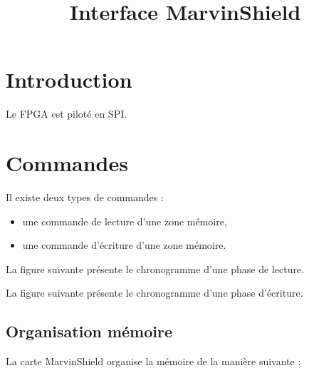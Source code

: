 \documentclass[11pt]{article}
\begin{document}
\title{Interface MarvinShield}

\section{Introduction}

Le FPGA est piloté en SPI.


\section{Commandes}

Il existe deux types de commandes :
\begin{itemize}
  \item une commande de lecture d'une zone mémoire,
  \item une commande d'écriture d'une zone mémoire. 
\end{itemize}

La figure suivante présente le chronogramme d'une phase de lecture.

La figure suivante présente le chronogramme d'une phase d'écriture.

\subsection{Organisation mémoire}

La carte MarvinShield organise la mémoire de la manière suivante : \\
\end{document}
